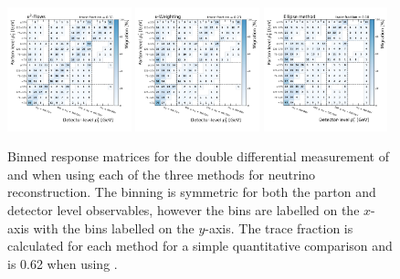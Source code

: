 \begin{figure}[htp]
    \includegraphics[width=0.32\textwidth]{Figures/neutrino_unfolding/unfolding/unfold_top_pt_transformer_encoder.pdf}
    \includegraphics[width=0.32\textwidth]{Figures/neutrino_unfolding/unfolding/unfold_top_pt_nu_weighting.pdf}
    \includegraphics[width=0.32\textwidth]{Figures/neutrino_unfolding/unfolding/unfold_top_pt_nu_ellipse.pdf}
    \caption{Binned response matrices for the double differential measurement of \mttbar and \pttop when using each of the three methods for neutrino reconstruction. The binning is symmetric for both the parton and detector level observables, however the \mttbar bins are labelled on the $x$-axis with the \pttop bins labelled on the $y$-axis.
        The trace fraction is calculated for each method for a simple quantitative comparison and is 0.62 when using \vtruth.}
    \label{fig:unfold_pttop}
\end{figure}

